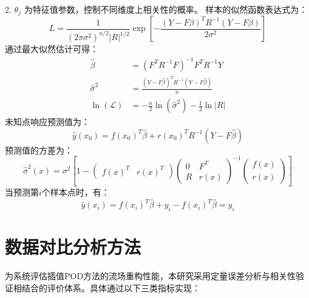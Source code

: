 2. \( \theta_j \) 为特征值参数，控制不同维度上相关性的概率。
样本的似然函数表达式为：
\begin{equation}
    L = \frac{1}{(2\pi\sigma^2)^{n/2}|R|^{1/2}} \exp\left[-\frac{(Y-F\beta)^T R^{-1}(Y-F\beta)}{2\sigma^2}\right]
    \label{eq:2.7}
\end{equation}
通过最大似然估计可得：
\begin{align}
    \hat{\beta} &= (F^T R^{-1} F)^{-1} F^T R^{-1} Y
    \label{eq:2.8} \\
    \hat{\sigma}^2 &= \frac{(Y-F\hat{\beta})^T R^{-1} (Y-F\hat{\beta})}{n}
    \label{eq:2.9} \\
    \ln(\mathcal{L}) &= -\frac{n}{2} \ln(\hat{\sigma}^2) - \frac{1}{2} \ln |R|
    \label{eq:2.10}
\end{align}
未知点响应预测值为：
\begin{equation}
    \hat{y}(x_0) = f(x_0)^T \hat{\beta} + r(x_0)^T R^{-1} (Y-F\hat{\beta})
    \label{eq:2.11}
\end{equation}
预测值的方差为：
\begin{equation}
    \hat{\sigma}^2(x) = \sigma^2 \left[ 1 - \begin{pmatrix} f(x)^T & r(x)^T \end{pmatrix} \begin{pmatrix} 0 & F^T \\ R & r(x) \end{pmatrix}^{-1} \begin{pmatrix} f(x) \\ r(x) \end{pmatrix} \right]
    \label{eq:2.12}
\end{equation}
当预测第\( i \)个样本点时，有：
\begin{equation}
    \hat{y}(x_i) = f(x_i)^T \hat{\beta} + y_i - f(x_i)^T \hat{\beta} = y_i
    \label{eq:2.14}
\end{equation}
\section{数据对比分析方法}
\label{sec:4.1}
为系统评估插值POD方法的流场重构性能，本研究采用定量误差分析与相关性验证相结合的评价体系。具体通过以下三类指标实现：

